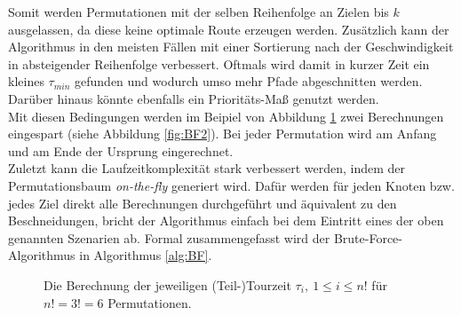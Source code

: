 \documentclass[german,version-2019-11]{uzl-thesis}
\begin{document}
Somit werden Permutationen mit der selben Reihenfolge an Zielen bis $k$ ausgelassen, da diese keine optimale Route erzeugen werden. Zusätzlich kann der Algorithmus in den meisten Fällen mit einer Sortierung nach der Geschwindigkeit in absteigender Reihenfolge verbessert. Oftmals wird damit in kurzer Zeit ein kleines $\tau_{min}$ gefunden und wodurch umso mehr Pfade abgeschnitten werden. Darüber hinaus könnte ebenfalls ein Prioritäts-Maß genutzt werden. \\
Mit diesen Bedingungen werden im Beipiel von Abbildung \ref{fig:BF1} zwei Berechnungen eingespart (siehe Abbildung \ref{fig:BF2}). Bei jeder Permutation wird am Anfang und am Ende der Ursprung eingerechnet. \\
Zuletzt kann die Laufzeitkomplexität stark verbessert werden, indem der Permutationsbaum \emph{on-the-fly} generiert wird. Dafür werden für jeden Knoten bzw. jedes Ziel direkt alle Berechnungen durchgeführt und äquivalent zu den Beschneidungen, bricht der Algorithmus einfach bei dem Eintritt eines der oben genannten Szenarien ab. Formal zusammengefasst wird der Brute-Force-Algorithmus in Algorithmus \ref{alg:BF}. \\

\begin{figure}[htbp]
\centering
{}
\caption{Die Berechnung der jeweiligen (Teil-)Tourzeit $\tau_{i}, ~1\leq i\leq n!$ für $n!=3!=6$ Permutationen.}
\label{fig:BF1}
\end{figure}
\end{document}
